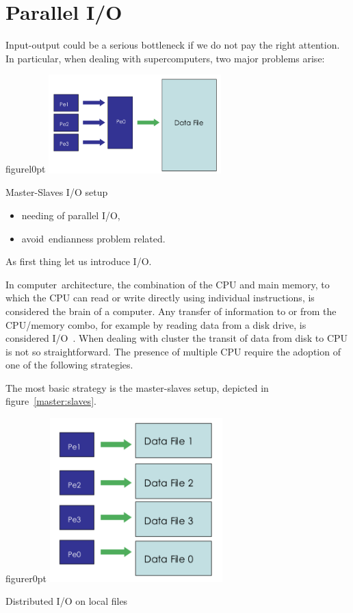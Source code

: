 \section{Parallel I/O}

Input-output could be a serious bottleneck if we do not pay the right attention.
In particular, when dealing with supercomputers, two major problems arise:
\begin{wrapfloat}{figure}{l}{0pt}
\includegraphics[width=0.5\textwidth]{grafici/masterslave}
\caption{Master-Slaves I/O setup}
\label{master:slaves}
\end{wrapfloat}
\begin{itemize}
\item needing of parallel I/O,
\item avoid~endianness problem related.
\end{itemize}
As first thing let us introduce I/O.\par
In computer~architecture, the combination of the CPU and main memory, to which the CPU can read or write directly using individual instructions, is considered the brain of a computer. Any transfer of information to or from the CPU/memory combo, for example by reading data from a disk drive, is considered I/O~\cite{io}.
When dealing with cluster the transit of data from disk to CPU is not so straightforward. The presence of multiple CPU require the adoption of one of the following strategies.\par
The most basic strategy is the master-slaves setup, depicted in figure~\ref{master:slaves}. 
\begin{wrapfloat}{figure}{r}{0pt}
\includegraphics[width=0.5\textwidth]{grafici/localio}
\caption{Distributed I/O on local files}
\end{wrapfloat}
